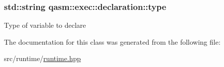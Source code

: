 \subsubsection[{\texorpdfstring{type}{type}}]{\setlength{\rightskip}{0pt plus 5cm}std\+::string qasm\+::exec\+::declaration\+::type}\hypertarget{classqasm_1_1exec_1_1declaration_a165d72745d002f80716cbd37f27687fe}{}\label{classqasm_1_1exec_1_1declaration_a165d72745d002f80716cbd37f27687fe}
Type of variable to declare 

The documentation for this class was generated from the following file\+:\begin{DoxyCompactItemize}
\item 
src/runtime/\hyperlink{runtime_8hpp}{runtime.\+hpp}\end{DoxyCompactItemize}
